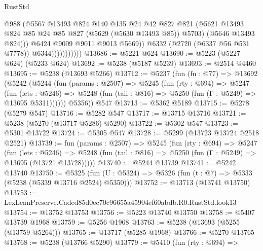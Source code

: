 \begin{lexlean}{RustStd}
\begin{coremodule}
                                @988
                                (@5567
                                  @13493
                                  @824
                                  @140
                                  @135
                                  @24
                                  @42
                                  @827
                                  @821
                                  (@5621
                                    @13493
                                    @824
                                    @85
                                    @24
                                    @85
                                    @827
                                    (@5629 (@5630 @13493 @85))
                                    @5703)
                                  (@5646 @13493 @824)))
                              @6424
                              @9009
                              @9011
                              @9013
                              @5669))
                          @6332
                          (@2720 (@6337 @56 @531 @7778))
                          @6344)))))))))))
@13686 := @5221 @624
@13690 := @5223 (@5227 @624) (@5233 @624)
@13692 := @5238 (@5187 @5239)
@13693 := @2514 @4460
@13695 := @5238 (@13693 @5266)
@13712 := @5237
    (fun (fn : @77) =>
    @13692
      (@5242
        (@5244
          (fun (params : @2507) =>
          @5245
            (fun (rty : @694) =>
            @5247
              (fun (lets : @5246) =>
              @5248 (fun (tail : @816) => @5250 (fun (Γ : @5249) => @13695 @5311))))))
        @5356))
    @547
@13713 := @5362 @5189
@13715 := @5278 (@5279 @547)
@13716 := @5282 @547
@13717 := @13715 @13716
@13721 := @5238 (@5270 (@13717 @5286) @5290)
@13722 := @5302 @547
@13723 := @5301 @13722
@13724 := @5305 @547
@13728 := @5299 (@13723 @13724 @2518 @2521)
@13739 := fun (params : @2507) =>
  @5245
    (fun (rty : @694) =>
    @5247
      (fun (lets : @5246) =>
      @5248 (fun (tail : @816) => @5250 (fun (Γ : @5249) => @13695 (@13721 @13728)))))
@13740 := @5244 @13739
@13741 := @5242 @13740
@13750 := @5325
    (fun (U : @5324) => @5326 (fun (t : @7) => @5333 (@5238 (@5339 @13716 @2524) @5350)))
@13752 := @13713 (@13741 @13750)
@13753 := LexLeanPreserve.Caded85d0ec70c96655a45904ef60abdb.R0.RustStd.look13
@13754 := @13752 @13753
@13756 := @5223 @13740 @13750
@13758 := @5407 @13739 @1968
@13759 := @5256 @1968
@13763 := @5238 (@13693 (@5255 (@13759 @5264)))
@13765 := @13717 (@5285 @1968)
@13766 := @5270 @13765
@13768 := @5238 (@13766 @5290)
@13779 := @5410
    (fun (rty : @694) =>

\end{coremodule}
\end{lexlean}
